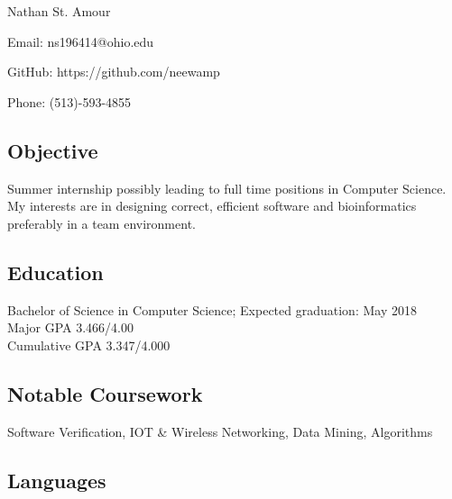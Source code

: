 \documentclass[11pt]{article} %
\date{}
\newcommand{\name}[1]{
  \centerline{\Huge{#1}}
  }
\begin{document}
\thispagestyle{empty}
\name{Nathan St. Amour}
\begin{center}

 
 
\centerline{\large{Email: ns196414@ohio.edu}}
\centerline{GitHub: https://github.com/neewamp}
\centerline{\large{Phone: (513)-593-4855}}

\end{center}
\subsection*{Objective}
 Summer internship possibly leading to full time positions in Computer Science. My interests are in designing correct, efficient software and bioinformatics preferably in a team environment.
 \subsection*{Education}
 Bachelor of Science in Computer Science; Expected graduation: May 2018\\
 Major GPA   3.466/4.00 \\
 Cumulative GPA   3.347/4.000


 \subsection*{Notable Coursework}
Software Verification, IOT \& Wireless Networking, Data Mining,
Algorithms
\subsection*{Languages}


\end{document}
